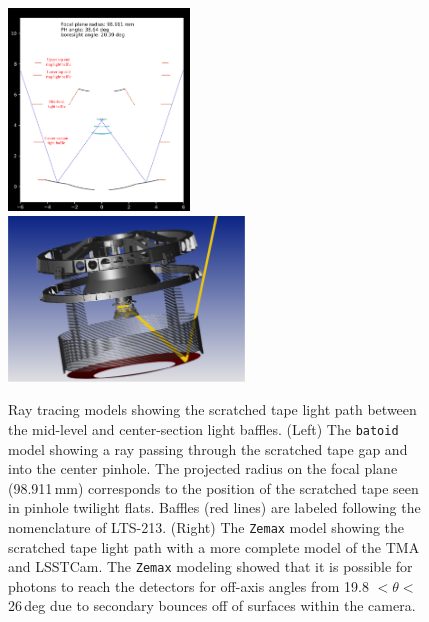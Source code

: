\documentclass[SE,lsstdraft,authoryear,toc]{lsstdoc}
\begin{document}
\begin{figure}[t]
    \centering
    \includegraphics[width=0.43\textwidth]{figures/batoid_model.png}
    \includegraphics[width=0.56\textwidth, trim = {3.5cm 0cm 3cm 0cm}, clip]{figures/zemax_model.png}
    \caption{\label{fig:raytrace} Ray tracing models showing the scratched tape light path between the mid-level and center-section light baffles. (Left) The \texttt{batoid} model showing a ray passing through the scratched tape gap and into the center pinhole. The projected radius on the focal plane (98.911\,mm) corresponds to the position of the scratched tape seen in pinhole twilight flats. Baffles (red lines) are labeled following the nomenclature of LTS-213. (Right) The \texttt{Zemax} model showing the scratched tape light path with a more complete model of the TMA and LSSTCam. The \texttt{Zemax} modeling showed that it is possible for photons to reach the detectors for off-axis angles from 19.8 $< \theta <$ 26\,deg due to secondary bounces off of surfaces within the camera.}
\end{figure}
\end{document}
